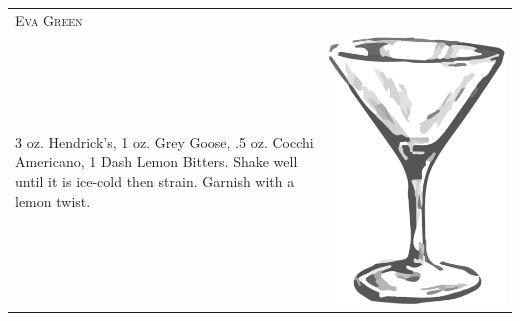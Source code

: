\documentclass{article}
\begin{document}
\begin{tabular}{p{2in} p{0.5in}}
	\multicolumn{2}{p{3in}}{\centering\Huge\textsc{Eva Green}}\\ 
	  \vspace{-0.1in}3 oz. Hendrick's, 1 oz. Grey Goose, .5 oz. Cocchi Americano, 1 Dash Lemon Bitters. Shake well until it is ice-cold then strain. Garnish with a lemon twist. &
	  \vspace{-0.1in} \includegraphics{goblet.png}
\end{tabular}\\
\end{document}
